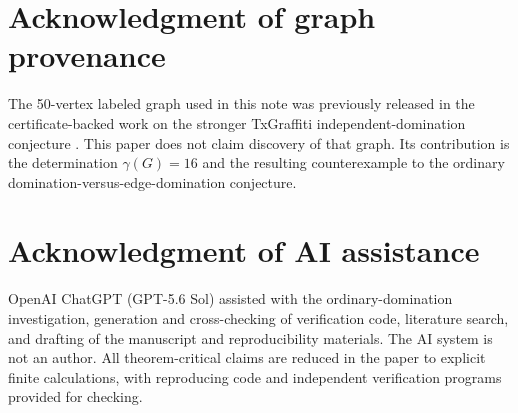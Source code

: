 \documentclass[11pt]{article}
\theoremstyle{definition}
\theoremstyle{remark}
\begin{document}
\section*{Acknowledgment of graph provenance}
The 50-vertex labeled graph used in this note was previously released in the certificate-backed work on the stronger TxGraffiti independent-domination conjecture \cite{TxGraffiti2026}.  This paper does not claim discovery of that graph.  Its contribution is the determination \(\gamma(G)=16\) and the resulting counterexample to the ordinary domination-versus-edge-domination conjecture.

\section*{Acknowledgment of AI assistance}
OpenAI ChatGPT (GPT-5.6 Sol) assisted with the ordinary-domination investigation, generation and cross-checking of verification code, literature search, and drafting of the manuscript and reproducibility materials.  The AI system is not an author.  All theorem-critical claims are reduced in the paper to explicit finite calculations, with reproducing code and independent verification programs provided for checking.
\end{document}
